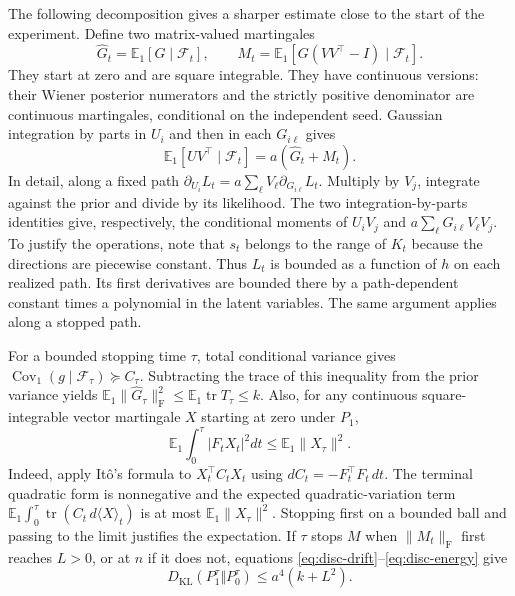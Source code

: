 The following decomposition gives a sharper estimate close to the
start of the experiment. Define two matrix-valued martingales
\[
 \widehat G_t=\mathbb E_1[G\mid\mathcal F_t],\qquad
 M_t=\mathbb E_1[G(VV^\top-I)\mid\mathcal F_t].
\]
They start at zero and are square integrable. They have continuous
versions: their Wiener posterior numerators and the strictly positive
denominator are continuous martingales, conditional on the independent
seed. Gaussian integration by parts in \(U_i\) and then in each \(G_{i\ell}\)
gives
\begin{equation}\label{eq:disc-Stein}
 \mathbb E_1[UV^\top\mid\mathcal F_t]=a(\widehat G_t+M_t).
\end{equation}
In detail, along a fixed path
\(\partial_{U_i}L_t=a\sum_\ell V_\ell\partial_{G_{i\ell}}L_t\).
Multiply by \(V_j\), integrate against the prior and divide by its
likelihood. The two integration-by-parts identities give, respectively,
the conditional moments of \(U_iV_j\) and
\(a\sum_\ell G_{i\ell}V_\ell V_j\). To justify the operations, note
that \(s_t\) belongs to the range of \(K_t\) because the directions are
piecewise constant. Thus \(L_t\) is bounded as a function of \(h\) on
each realized path. Its first derivatives are bounded there by a
path-dependent constant times a polynomial in the latent variables.
The same argument applies along a stopped path.

For a bounded stopping time \(\tau\), total conditional variance gives
\(\operatorname{Cov}_1(g\mid\mathcal F_\tau)\succeq C_\tau\).
Subtracting the trace of this inequality from the prior variance yields
\(\mathbb E_1\|\widehat G_\tau\|_{\mathrm F}^2\le \mathbb E_1\operatorname{tr}T_\tau\le k\).
Also, for any continuous square-integrable vector martingale \(X\) starting
at zero under \(P_1\),
\begin{equation}\label{eq:disc-energy}
 \mathbb E_1\int_0^\tau |F_t X_t|^2dt\le\mathbb E_1\|X_\tau\|^2 .
\end{equation}
Indeed, apply It\^o's formula to \(X_t^\top C_t X_t\) using
\(dC_t=-F_t^\top F_t\,dt\). The terminal quadratic form is nonnegative
and the expected quadratic-variation term
\(\mathbb E_1\int_0^\tau\operatorname{tr}(C_t\,d\langle X\rangle_t)\)
is at most \(\mathbb E_1\|X_\tau\|^2\). Stopping first on a bounded
ball and passing to the limit justifies the expectation.
If \(\tau\) stops \(M\) when \(\|M_t\|_{\mathrm F}\) first reaches \(L>0\),
or at \(n\) if it does not, equations
\eqref{eq:disc-drift}--\eqref{eq:disc-energy} give
\begin{equation}\label{eq:disc-stop}
 D_{\mathrm{KL}}(P_1^\tau\Vert P_0^\tau)
 \le a^4(k+L^2).
\end{equation}

